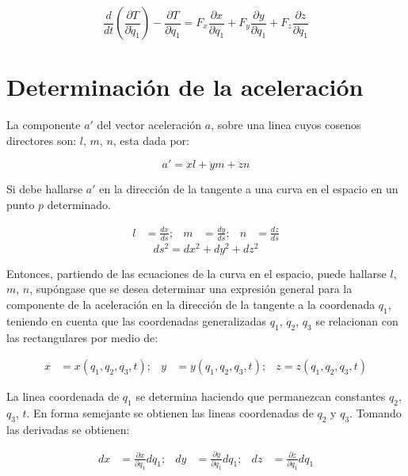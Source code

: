 \begin{equation*}
    \frac{d}{dt}\left(
        \frac{\partial T}{\partial\dot{q}_1}
    \right)-
    \frac{\partial T}{\partial q_1}=
    F_x\frac{\partial x}{\partial q_1}+
    F_y\frac{\partial y}{\partial q_1}+
    F_z\frac{\partial z}{\partial q_1}
    \label{lagrange}
\end{equation*}

\section{Determinación de la aceleración}
La componente $a'$ del vector aceleración $a$, sobre una linea cuyos cosenos
directores son: $l$, $m$, $n$, esta dada por:

\begin{equation*}
    a'=\ddot{x}l+\ddot{y}m+\ddot{z}n
\end{equation*}

Si debe hallarse $a'$ en la dirección de la tangente a una curva en el espacio
en un punto $p$ determinado.

\begin{align*}
    l&=\frac{dx}{ds}; & m&=\frac{dy}{ds}; & n&=\frac{dz}{ds}
\end{align*}
\begin{equation*}
    ds^2=dx^2+dy^2+dz^2
\end{equation*}

Entonces, partiendo de las ecuaciones de la curva en el espacio, puede hallarse
$l$, $m$, $n$, supóngase que se desea determinar una expresión general para la
componente de la aceleración en la dirección de la tangente a la coordenada
$q_1$, teniendo en cuenta que las coordenadas generalizadas $q_1$, $q_2$, $q_3$
se relacionan con las rectangulares por medio de:

\begin{align*}
    x&=x(q_1,q_2,q_3,t); & y&=y(q_1,q_2,q_3,t); & z=z(q_1,q_2,q_3,t)
\end{align*}

La linea coordenada de $q_1$ se determina haciendo que permanezcan constantes
$q_2$, $q_3$, $t$. En forma semejante se obtienen las lineas coordenadas de
$q_2$ y $q_3$. Tomando las derivadas se obtienen:

\begin{align*}
    dx&=\frac{\partial x}{\partial q_1}dq_1; &
    dy&=\frac{\partial y}{\partial q_1}dq_1; &
    dz&=\frac{\partial z}{\partial q_1}dq_1
\end{align*}

